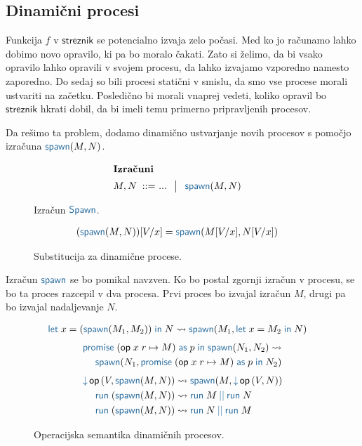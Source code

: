 \subsection{Dinamični procesi}

Funkcija $f$ v $\mathsf{streznik}$ se potencialno izvaja zelo počasi. Med ko jo računamo lahko dobimo novo opravilo, ki pa bo moralo čakati. Zato si želimo, da bi vsako opravilo lahko opravili v svojem procesu, da lahko izvajamo vzporedno namesto zaporedno. 
Do sedaj so bili procesi statični v smislu, da smo vse procese morali ustvariti na začetku.
Posledično bi morali vnaprej vedeti, koliko opravil bo $\mathsf{streznik}$ hkrati dobil, da bi imeli temu primerno pripravljenih procesov.

Da rešimo ta problem, dodamo dinamično ustvarjanje novih procesov s pomočjo izračuna $\tmspawn{M}{N}$. 

\begin{figure}[H]	
	\centering
	\small
	\begin{align*}
	\shortintertext{\textbf{Izračuni}}
	M, N
	\bnfis & ... \,\bnfor\! \tmspawn{M}{N}
	\end{align*}
	
	\caption{Izračun $\tmkw{Spawn}$.}
	\label{fig:izračun-spawn}
\end{figure}


\begin{figure}[H]
	\centering
	\small
	\begin{align*}
		(\tmspawn{M}{N})[V/x] &= \tmspawn{M[V/x]}{N[V/x]}
	\end{align*}
	\caption{Substitucija za dinamične procese.}
	\label{fig:substitucija-spawn}
\end{figure}

Izračun $\tmkw{spawn}$ se bo pomikal navzven. Ko bo postal zgornji izračun v procesu, se bo ta proces razcepil v dva procesa. 
Prvi proces bo izvajal izračun $M$, drugi pa bo izvajal nadaljevanje $N$.

\begin{figure}[H]
	\centering
	\small
	\begin{align*}
	\tmlet{x}{(\tmspawn{M_1}{M_2})}{N} & \reduces \tmspawn{M_1}{\tmlet{x}{M_2}{N}}
	\end{align*}
	\vspace{-6ex}
	\begin{align*}
	\tmwithrec{op}{x}{r}{M}{p}{\tmspawn{N_1}{N_2}} \reduces \\
	\tmspawn{N_1}{\tmwithrec{op}{x}{r}{M}{p}{N_2}}
	\end{align*}
	\vspace{-6ex}
	\begin{align*}
	\tmopin{op}{V}{\tmspawn{M}{N}} & \reduces \tmspawn{M}{\tmopin{op}{V}{N}}
	\\
	\tmrun{(\tmspawn{M}{N})} & \reduces \tmpar{\tmrun{M}}{\tmrun{N}}
	\\
	\tmrun{(\tmspawn{M}{N})} & \reduces \tmpar{\tmrun{N}}{\tmrun{M}}
	\end{align*}
	
	\caption{Operacijska semantika dinamičnih procesov.}
	\label{fig:semantika-spawn}
\end{figure}

